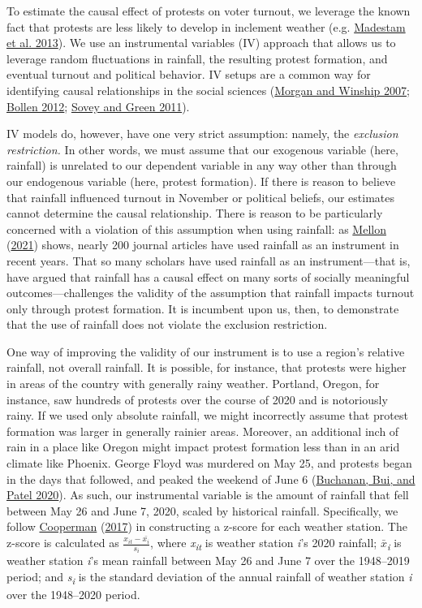 \documentclass[
  12pt,
]{article}
\begin{document}
To estimate the causal effect of protests on voter turnout, we leverage the known fact that protests are less likely to develop in inclement weather (e.g. \protect\hyperlink{ref-Madestam2013}{Madestam et al. 2013}). We use an instrumental variables (IV) approach that allows us to leverage random fluctuations in rainfall, the resulting protest formation, and eventual turnout and political behavior. IV setups are a common way for identifying causal relationships in the social sciences (\protect\hyperlink{ref-Morgan2007}{Morgan and Winship 2007}; \protect\hyperlink{ref-Bollen2012}{Bollen 2012}; \protect\hyperlink{ref-Sovey2011}{Sovey and Green 2011}).

IV models do, however, have one very strict assumption: namely, the \emph{exclusion restriction.} In other words, we must assume that our exogenous variable (here, rainfall) is unrelated to our dependent variable in any way other than through our endogenous variable (here, protest formation). If there is reason to believe that rainfall influenced turnout in November or political beliefs, our estimates cannot determine the causal relationship. There is reason to be particularly concerned with a violation of this assumption when using rainfall: as \protect\hyperlink{ref-Mellon2021}{Mellon} (\protect\hyperlink{ref-Mellon2021}{2021}) shows, nearly 200 journal articles have used rainfall as an instrument in recent years. That so many scholars have used rainfall as an instrument---that is, have argued that rainfall has a causal effect on many sorts of socially meaningful outcomes---challenges the validity of the assumption that rainfall impacts turnout only through protest formation. It is incumbent upon us, then, to demonstrate that the use of rainfall does not violate the exclusion restriction.

One way of improving the validity of our instrument is to use a region's relative rainfall, not overall rainfall. It is possible, for instance, that protests were higher in areas of the country with generally rainy weather. Portland, Oregon, for instance, saw hundreds of protests over the course of 2020 and is notoriously rainy. If we used only absolute rainfall, we might incorrectly assume that protest formation was larger in generally rainier areas. Moreover, an additional inch of rain in a place like Oregon might impact protest formation less than in an arid climate like Phoenix. George Floyd was murdered on May 25, and protests began in the days that followed, and peaked the weekend of June 6 (\protect\hyperlink{ref-Buchanan2020}{Buchanan, Bui, and Patel 2020}). As such, our instrumental variable is the amount of rainfall that fell between May 26 and June 7, 2020, scaled by historical rainfall. Specifically, we follow \protect\hyperlink{ref-Cooperman2017}{Cooperman} (\protect\hyperlink{ref-Cooperman2017}{2017}) in constructing a z-score for each weather station. The z-score is calculated as \(\frac{x_{it} - \bar{x_{i}}}{s_{i}}\), where \emph{x\textsubscript{it}} is weather station \emph{i}'s 2020 rainfall; \(\bar{x}\)\emph{\textsubscript{i}} is weather station \emph{i}'s mean rainfall between May 26 and June 7 over the 1948--2019 period; and \emph{s\textsubscript{i}} is the standard deviation of the annual rainfall of weather station \emph{i} over the 1948--2020 period.
\end{document}

